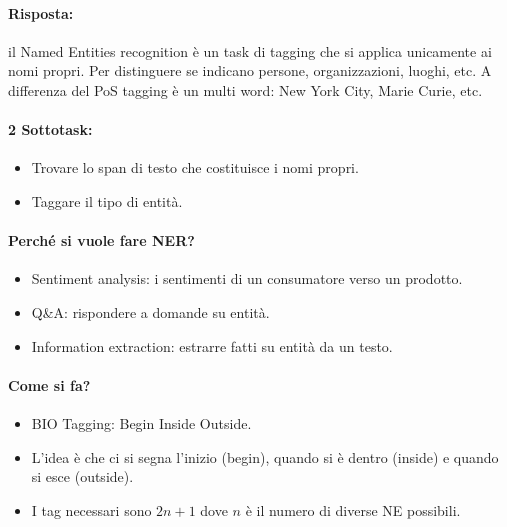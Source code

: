 
\paragraph{Risposta:} il Named Entities recognition è un task di tagging che si applica unicamente ai nomi propri. Per distinguere se indicano persone, organizzazioni, luoghi, etc. A differenza del PoS tagging è un multi word: New York City, Marie Curie, etc. 

\paragraph{2 Sottotask:}

\begin{itemize}
  \item Trovare lo span di testo che costituisce i nomi propri. 
  \item Taggare il tipo di entità.
\end{itemize}

\paragraph{Perché si vuole fare NER?}

\begin{itemize}
  \item Sentiment analysis: i sentimenti di un consumatore verso un prodotto. 
  \item Q\&A: rispondere a domande su entità. 
  \item Information extraction: estrarre fatti su entità da un testo.
\end{itemize}

\paragraph{Come si fa?}

\begin{itemize}
  \item BIO Tagging: Begin Inside Outside.
  \item L'idea è che ci si segna l'inizio (begin), quando si è dentro (inside) e quando si esce (outside).
  \item I tag necessari sono $2n + 1$ dove $n$ è il numero di diverse NE possibili.
\end{itemize}

